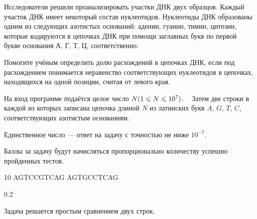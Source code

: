 
Исследователи решили проанализировать участки ДНК двух образцов. 
Каждый участок ДНК имеет некоторый состав нуклеотидов. Нуклеотиды ДНК образованы одним из следующих азотистых 
оснований: аденин, гуанин, тимин, цитозин, которые кодируются в цепочках ДНК при помощи заглавных 
букв по первой букве основания А, Г, Т, Ц, соответственно.

Помогите учёным определить долю расхождений в цепочках ДНК, если под расхождением понимается неравенство 
соответствующих нуклеотидов в цепочках, находящихся на одной позиции, считая от левого края.


На вход программе подаётся целое число $N\space(1\leq N \leq 10^7)$.  
Затем две строки в каждой из которых записана цепочка длиной $N$ из латинских букв $A$, $G$, $T$, $C$, 
соответствующих азотистым основаниям.

\outputfmtSection

Единственное число — ответ на задачу с точностью не ниже $10^{-7}$.

\markSection

Баллы за задачу будут начисляться пропорционально количеству успешно пройденных тестов.


\begin{myverbbox}[\small]{\vinput}
10
AGTCCGTCAG
AGTGCCTCAG
\end{myverbbox}
\begin{myverbbox}[\small]{\voutput}
0.2
\end{myverbbox}

\solutionSection

Задача решается простым сравнением двух строк.


